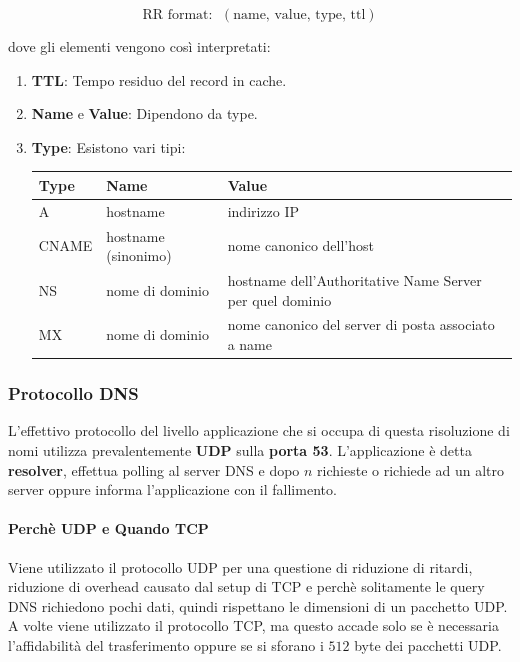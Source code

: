\documentclass{article}
\begin{document}
\[ \boxed{\text{RR format}: \:\: ( \text{name, value, type, ttl})} \]

\vspace*{10px}

dove gli elementi vengono così interpretati:

\begin{enumerate}
    \item \textbf{TTL}: Tempo residuo del record in cache.
    \item \textbf{Name} e \textbf{Value}: Dipendono da type.
    \item \textbf{Type}: Esistono vari tipi:
    \vspace*{5px}
    \begin{center}
        \begin{tabular}{|l|l|p{}|}
        \hline
        \textbf{Type} & \textbf{Name} & \textbf{Value} \\
        \hline
        A & hostname & indirizzo IP \\
        \hline
        CNAME & hostname (sinonimo) & nome canonico dell'host \\
        \hline
        NS & nome di dominio & hostname dell'Authoritative Name Server per quel dominio \\
        \hline
        MX & nome di dominio & nome canonico del server di posta associato a name \\
        \hline
        \end{tabular}
    \end{center}
\end{enumerate}

\vspace*{15px}

\subsubsection{Protocollo DNS}

L'effettivo protocollo del livello applicazione che si occupa di questa risoluzione di nomi utilizza prevalentemente \textbf{UDP} sulla \textbf{porta 53}.
L'applicazione è detta \textbf{resolver}, effettua polling al server DNS e dopo $n$ richieste o richiede ad un altro server oppure informa l'applicazione con il fallimento.

\vspace*{10px}

\paragraph{Perchè UDP e Quando TCP} Viene utilizzato il protocollo UDP per una questione di riduzione di ritardi, riduzione di overhead causato dal setup di TCP e perchè solitamente le query DNS richiedono pochi dati, quindi rispettano le dimensioni di un pacchetto UDP. A volte viene utilizzato il protocollo TCP, ma questo
accade solo se è necessaria l'affidabilità del trasferimento oppure se si sforano i $512$ byte dei pacchetti UDP.
\end{document}
